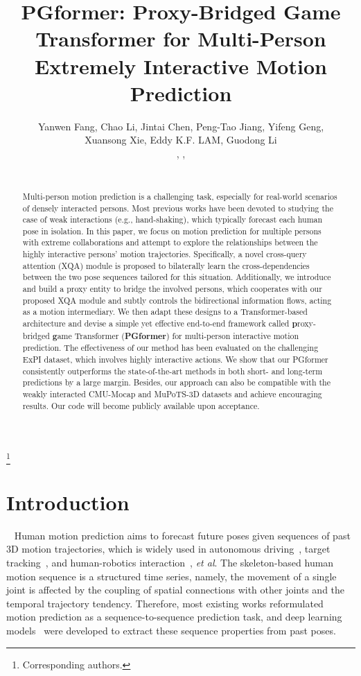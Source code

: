 \documentclass[10pt,twocolumn,letterpaper]{article}
\title{PGformer: Proxy-Bridged Game Transformer for Multi-Person \\ Extremely Interactive Motion Prediction}
\author{\vspace{-1.0em}
Yanwen Fang\affmark[1,2], 
Chao Li\affmark[2], 
Jintai Chen\affmark[3], 
Peng-Tao Jiang\affmark[3], 
Yifeng Geng\affmark[2], \\
\vspace{-0.8em}
Xuansong Xie\affmark[2], 
Eddy K.F. LAM\affmark[1], 
Guodong Li\affmark[1] \\
\vspace{0.5em}
\affaddr{\affmark[1]The University of Hong Kong},
\affaddr{\affmark[2]DAMO Academy, Alibaba}, 
\affaddr{\affmark[3]Zhejiang University} \\
\small
 \email{u3545683@connect.hku.hk, lllcho.lc@alibaba-inc.com, jtigerchen@zju.edu.cn, pt.jiang@mail.nankai.edu.cn, gengyifeng@gmail.com, xingtong.xxs@taobao.com, hrntlkf@hku.hk, gdli@hku.hk} \\
}
\newcommand\nnfootnote[1]{\begin{NoHyper}
  \renewcommand\thefootnote{}\footnote{#1}\addtocounter{footnote}{-1}\end{NoHyper}
}
\begin{document}
\maketitle
\nnfootnote{ Corresponding authors.}
\ificcvfinal\thispagestyle{empty}\fi

\vspace{-2em}
\begin{abstract}
Multi-person motion prediction is a challenging task, especially for real-world scenarios of densely interacted persons. 
Most previous works have been devoted to studying the case of weak interactions (e.g., hand-shaking), which typically forecast each human pose in isolation.
In this paper, we focus on motion prediction for multiple persons with extreme collaborations and attempt to explore the relationships between the highly interactive persons' motion trajectories. 
Specifically, a novel cross-query attention (XQA) module is proposed to bilaterally learn the cross-dependencies between the two pose sequences tailored for this situation. 
Additionally, we introduce and build a proxy entity to bridge the involved persons, which cooperates with our proposed XQA module and subtly controls the bidirectional information flows, acting as a motion intermediary. 
We then adapt these designs to a Transformer-based architecture and devise a simple yet effective end-to-end framework called \textbf{p}roxy-bridged \textbf{g}ame Transformer (\textbf{PGformer}) for multi-person interactive motion prediction.
The effectiveness of our method has been evaluated on the challenging ExPI dataset, which involves highly interactive actions. 
We show that our PGformer consistently outperforms the state-of-the-art methods in both short- and long-term predictions by a large margin. 
Besides, our approach can also be compatible with the weakly interacted CMU-Mocap and MuPoTS-3D datasets and achieve encouraging results. 
Our code will become publicly available upon acceptance. 
\end{abstract}


\section{Introduction} 
~\label{sec:intro}
Human motion prediction aims to forecast future poses given sequences of past 3D motion trajectories, 
which is widely used in autonomous driving~\cite{djuric2020uncertainty,akbari2017automatic}, target tracking~\cite{6126296}, and human-robotics interaction~\cite{Koppula2013AnticipatingHA, butepage2018anticipating}, \textit{et al}.
The skeleton-based human motion sequence is a structured time series, namely, the movement of a single joint is affected by the coupling of spatial connections with other joints and the temporal trajectory tendency.
Therefore, most existing works reformulated motion prediction as a sequence-to-sequence prediction task, and deep learning models~\cite{julieta2017motion, Aksan_2019_ICCV, Martinez_potr_ICCV2021, 9665904, Zhong2022SpatioTemporalGG, sofianos2021spacetimeseparable} were developed to extract these sequence properties from past poses.
\end{document}
